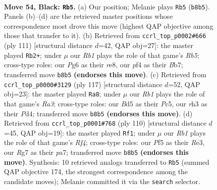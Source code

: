 \documentclass[11pt]{article}
\begin{document}
\clearpage

\begin{figure}[p]\centering
\begin{subfigure}{0.46\textwidth}\centering
\resizebox{\linewidth}{!}{%
\newchessgame
\chessboard[
  setfen={1r1k4/p1p3r1/P1p3p1/2Pb1p1p/RP3P1P/7R/5K2/1N6 b - - 31 54},
  showmover=false,
  pgfstyle=straightmove, color=movearrow, markmove={b8-b5}
]}
\caption{}
\end{subfigure}\hfill
\begin{subfigure}{0.46\textwidth}\centering
\resizebox{\linewidth}{!}{%
\newchessgame
\chessboard[
  setfen={4R3/1b1n2pk/5p1p/1p1p1P2/1r1P1RPP/2p5/6K1/4N3 b - - 0 56},
  showmover=false,
  pgfstyle=straightmove, color=movearrow, markmove={b4-b2}
]}
\caption{}
\end{subfigure}
\\[4pt]
\begin{subfigure}{0.46\textwidth}\centering
\resizebox{\linewidth}{!}{%
\newchessgame
\chessboard[
  setfen={8/2k4p/r1p3pP/2p1PpP1/P1PpbP2/K7/3RB3/8 b - - 8 59},
  showmover=false,
  pgfstyle=straightmove, color=movearrow, markmove={a6-a8}
]}
\caption{}
\end{subfigure}\hfill
\begin{subfigure}{0.46\textwidth}\centering
\resizebox{\linewidth}{!}{%
\newchessgame
\chessboard[
  setfen={2r5/p1r2p1k/7p/3p3P/1p1P1RP1/1P2R3/P7/1K6 w - - 6 56},
  showmover=false,
  pgfstyle=straightmove, color=movearrow, markmove={f4-f1}
]}
\caption{}
\end{subfigure}
\caption{\textbf{Move 54, Black: \texttt{Rb5}.} (a) Our position; Melanie plays \texttt{Rb5} (\texttt{b8b5}). Panels (b)--(d) are the retrieved master positions whose correspondence most drove this move (highest QAP objective among those that transfer to it). (b) Retrieved from \texttt{ccrl\_top\_p0002\#666} (ply 111) [structural distance $d$=42, QAP obj=27]: the master played \texttt{Rb2+}; under $\mu$ our \emph{Rb1} plays the role of that game's \emph{Rb5}; cross-type roles: our \emph{P}g6 as their \emph{r}e8, our \emph{p}f4 as their \emph{B}b7; transferred move \texttt{b8b5} \textbf{(endorses this move)}. (c) Retrieved from \texttt{ccrl\_top\_p0000\#3129} (ply 117) [structural distance $d$=52, QAP obj=23]: the master played \texttt{Ra8}; under $\mu$ our \emph{Rb1} plays the role of that game's \emph{Ra3}; cross-type roles: our \emph{B}d5 as their \emph{P}c5, our \emph{r}h3 as their \emph{P}d4; transferred move \texttt{b8b5} \textbf{(endorses this move)}. (d) Retrieved from \texttt{ccrl\_top\_p0001\#768} (ply 110) [structural distance $d$=45, QAP obj=19]: the master played \texttt{Rf1}; under $\mu$ our \emph{Rb1} plays the role of that game's \emph{Rf4}; cross-type roles: our \emph{P}f5 as their \emph{R}e3, our \emph{R}g7 as their \emph{p}a7; transferred move \texttt{b8b5} \textbf{(endorses this move)}. Synthesis: 10 retrieved analogs transferred to \texttt{Rb5} (summed QAP objective 174, the strongest correspondence among the candidate moves); Melanie committed it via the \texttt{search} selector.}
\label{fig:thought-m107}
\end{figure}
\end{document}
